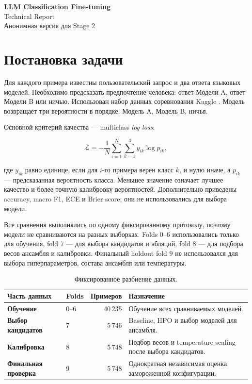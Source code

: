 \documentclass[a4paper,11pt]{article}
\newcommand{\metric}{\textit{log loss}}
\begin{document}
\begin{center}
  {\LARGE\bfseries\color{accent} LLM Classification Fine-tuning}\\[0.35em]
  {\large Technical Report}\\[0.6em]
  {\small Анонимная версия для Stage 2}
\end{center}

\vspace{0.5em}

\section{Постановка задачи}

Для каждого примера известны пользовательский запрос и два ответа языковых
моделей. Необходимо предсказать предпочтение человека: ответ Модели A, ответ
Модели B или ничью. Использован набор данных соревнования Kaggle \cite{kaggle}.
Модель возвращает три вероятности в порядке: Модель A, Модель B, ничья.

Основной критерий качества --- multiclass \metric:

\begin{equation}
  \mathcal{L} = -\frac{1}{N}\sum_{i=1}^{N}\sum_{k=1}^{3}
  y_{ik}\log p_{ik},
  \label{eq:logloss}
\end{equation}

где $y_{ik}$ равно единице, если для $i$-го примера верен класс $k$, и нулю
иначе, а $p_{ik}$ --- предсказанная вероятность класса. Меньшее значение
означает лучшее качество и более точную калибровку вероятностей. Дополнительно
приведены accuracy, macro F1, ECE и Brier score; они не использовались для
выбора модели.

Все сравнения выполнялись по одному фиксированному протоколу, поэтому модели
не сравниваются на разных выборках. Folds 0--6 использовались только для
обучения, fold 7 --- для выбора кандидатов и абляций, fold 8 --- для подбора
весов ансамбля и калибровки. Финальный holdout fold 9 не использовался для
выбора гиперпараметров, состава ансамбля или температуры.

\begin{table}[htbp]
\centering
\caption{Фиксированное разбиение данных.}
\label{tab:protocol}
\small
\begin{tabularx}{\textwidth}{|>{\bfseries}p{}|p{}|R|Y|}
\hline
{} Часть данных & Folds & Примеров & Назначение \\ \hline
Обучение & 0--6 & 40\,235 & Обучение всех сравниваемых моделей. \\ \hline
Выбор кандидатов & 7 & 5\,746 & Baseline, HPO и выбор моделей для ансамбля. \\ \hline
Калибровка & 8 & 5\,748 & Подбор весов и temperature scaling после выбора кандидатов. \\ \hline
Финальная проверка & 9 & 5\,748 & Однократная независимая оценка замороженной конфигурации. \\ \hline
\end{tabularx}
\end{table}
\end{document}
